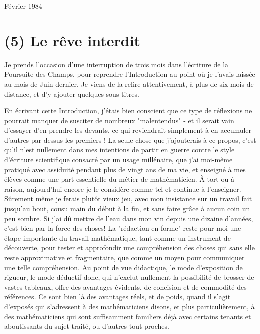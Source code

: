 Février 1984

\section{(5) Le rêve interdit}

Je prends l'occasion d'une interruption de trois mois dans l'écriture de la Poursuite des Champs, pour reprendre l'Introduction au point où je l'avais laissée au mois de Juin dernier. Je viens de la relire attentivement, à plus de six mois de distance, et d'y ajouter quelques sous-titres.

En écrivant cette Introduction, j'étais bien conscient que ce type de réflexions ne pourrait manquer de susciter de nombreux "malentendus" - et il serait vain d'essayer d'en prendre les devants, ce qui reviendrait simplement à en accumuler d'autres par dessus les premiers ! La seule chose que j'ajouterais à ce propos, c'est qu'il n'est nullement dans mes intentions de partir en guerre contre le style d'écriture scientifique consacré par un usage millénaire, que j'ai moi-même pratiqué avec assiduité pendant plus de vingt ans de ma vie, et enseigné à mes élèves comme une part essentielle du métier de mathématicien. À tort ou à raison, aujourd'hui encore je le considère comme tel et continue à l'enseigner. Sûrement même je ferais plutôt vieux jeu, avec mon insistance sur un travail fait jusqu'au bout, cousu main du début à la fin, et sans faire grâce à aucun coin un peu sombre. Si j'ai dû mettre de l'eau dans mon vin depuis une dizaine d'années, c'est bien par la force des choses! La "rédaction en forme" reste pour moi une étape importante du travail mathématique, tant comme un instrument de découverte, pour tester et approfondir une compréhension des choses qui sans elle reste approximative et fragmentaire, que comme un moyen pour communiquer une telle compréhension. Au point de vue didactique, le mode d'exposition de rigueur, le mode déductif donc, qui n'exclut nullement la possibilité de brosser de vastes tableaux, offre des avantages évidents, de concision et de commodité des références. Ce sont bien là des avantages réels, et de poids, quand il s'agit d'exposés qui s'adressent à des mathématiciens disons, et plus particulièrement, à des mathématiciens qui sont suffisamment familiers déjà avec certains tenants et aboutissants du sujet traité, ou d'autres tout proches.

